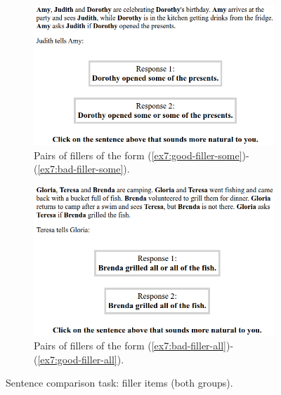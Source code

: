 \begin{figure}[H]
	\centering
	\begin{subfigure}[b]{.45\linewidth}
		\centering
		\includegraphics[width=\linewidth]{./images/exp2-screen-filler-some.png}
		\caption[]{Pairs of fillers of the form (\ref{ex7:good-filler-some})-(\ref{ex7:bad-filler-some}).}
	\end{subfigure}
	\hfill
	\begin{subfigure}[b]{.45\linewidth}
		\centering
		\includegraphics[width=\linewidth]{./images/exp2-screen-filler-all.png}
		\caption[]{Pairs of fillers of the form (\ref{ex7:bad-filler-all})-(\ref{ex7:good-filler-all}).}
	\end{subfigure}
	
	\caption[]{Sentence comparison task: filler items (both groups).}\label{fig7:exp2-screen-fillers}
\end{figure}


